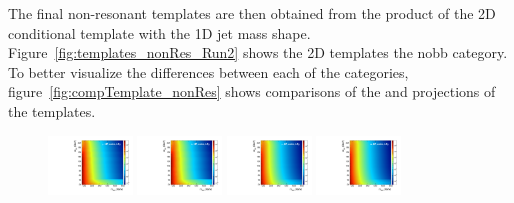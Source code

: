 The final non-resonant templates are then obtained from the product of the 2D conditional template with the 1D jet mass shape.
Figure~\ref{fig:templates_nonRes_Run2} shows the 2D templates the nobb category.
To better visualize the differences between each of the categories, figure~\ref{fig:compTemplate_nonRes} shows comparisons of the \MVV and \MJ projections of the templates.

\begin{figure}[htbp]
  \centering
  \includegraphics[width=0.2\textwidth]{fig/2Dfit/template_nonRes_mu_HP_nobb_LDy.pdf}
  \includegraphics[width=0.2\textwidth]{fig/2Dfit/template_nonRes_e_HP_nobb_LDy.pdf}
  \includegraphics[width=0.2\textwidth]{fig/2Dfit/template_nonRes_mu_LP_nobb_LDy.pdf}
  \includegraphics[width=0.2\textwidth]{fig/2Dfit/template_nonRes_e_LP_nobb_LDy.pdf}\\

\end{figure}
